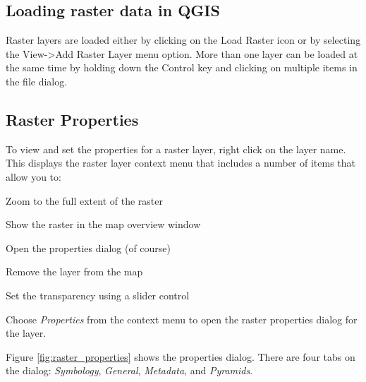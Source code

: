 \subsection{Loading raster data in QGIS}
Raster layers are
loaded either by clicking on the Load Raster icon or by selecting the View->Add
Raster Layer menu option. More than one layer can be loaded at the same time by
holding down the Control key and clicking on multiple items in the file
dialog.
	
\subsection{Raster Properties}

To
view and set the properties for a raster layer, right click on the layer name.
This displays the raster layer context menu that includes a number of items that
allow you to:
\begin{compactitem}
\item Zoom to the full extent of the raster
\item Show the raster in the map overview window
\item Open the properties dialog (of course)
\item Remove the layer from the map
\item Set the transparency using a slider control
\end{compactitem}
Choose \textsl{Properties} from the context menu to open the raster properties
dialog for the layer.


Figure \ref{fig:raster_properties} shows the properties dialog. There are four tabs on the dialog: \textsl{Symbology}, \textsl{General}, \textsl{Metadata}, and \textsl{Pyramids}.

